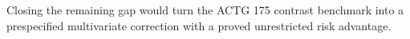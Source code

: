 Closing the remaining gap would turn the ACTG 175 contrast benchmark into a prespecified multivariate correction with a proved unrestricted risk advantage.